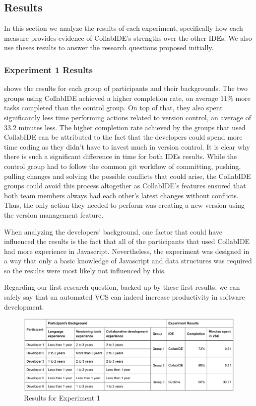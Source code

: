 \subsection{Results}

In this section we analyze the results of each experiment, specifically how each measure provides 
evidence of CollabIDE's strengths over the other IDEs. We also use theses results to answer the 
research questions proposed initially.

\subsubsection{Experiment 1 Results}

 shows the results for each group of participants and their 
backgrounds. The two groups using CollabIDE achieved a higher completion rate, on average $11\%$ 
more tasks completed than the control group. On top of that, they 
also spent significantly less time performing actions related to version control, an average of $33.2$  
minutes less. The higher completion rate achieved by the groups 
that used CollabIDE can be attributed to the fact that the developers could spend more time coding as 
they didn't have to invest much in version control. It is clear why there is such a significant difference in 
time for both IDEs results. While the control group had to follow the common git workflow of committing, 
pushing, pulling changes and solving the possible conflicts that could arise, the CollabIDE groups could 
avoid this process altogether as CollabIDE’s features ensured that both team members always had 
each other's latest changes without conflicts. Thus, the only action they needed to perform was 
creating a new version using the version management feature.

When analyzing the developers' background, one factor that could have influenced the results is the 
fact that all of the participants that used CollabIDE had more experience in Javascript. Nevertheless, 
the experiment was designed in a way that only a basic knowledge of Javascript and data structures 
was required so the results were most likely not influenced by this.

Regarding our first research question, backed up by these first results, we can safely say that an 
automated \ac{VCS} can indeed increase productivity in software development.

\begin{figure}[htbp]
  \centering
  \includegraphics[width=1\textwidth]{img/resultsTableCollaborative}
  \caption{Results for Experiment 1}
  \label{fig:resultsTableCollaborative}
\end{figure}

